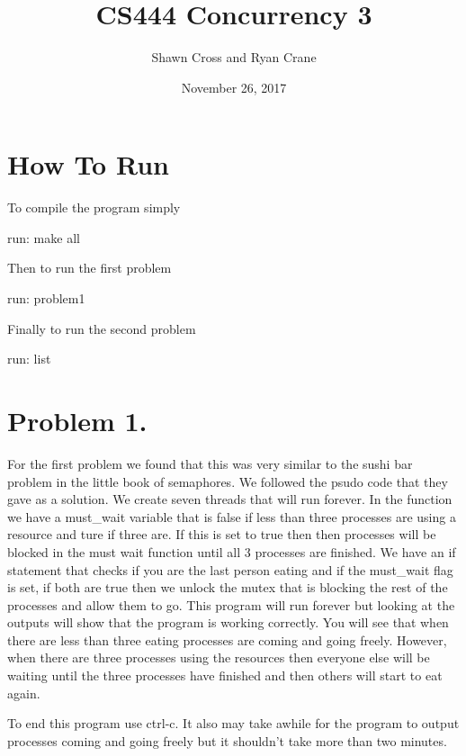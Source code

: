 \documentclass[letterpaper,10pt,titlepage]{article}
\begin{document}
\title{CS444 Concurrency 3}
\date{November 26, 2017}
\author{Shawn Cross and Ryan Crane}

\section{How To Run} To compile the program simply 

run: make all

Then to run the first problem 

run: problem1

Finally to run the second problem 

run: list

\section{Problem 1.} For the first problem we found that this was very similar 
to the sushi bar problem in the little book of semaphores. We followed the 
psudo code that they gave as a solution. We create seven threads that will 
run forever. In the function we have a must\_wait variable that is false if 
less than three processes are using a resource and ture if three are. If this is set to 
true then then processes will be blocked in the must wait function until all 3 processes 
are finished. We have an if statement that checks if you are the last person 
eating and if the must\_wait flag is set, if both are true then we unlock the 
mutex that is blocking the rest of the processes and allow them to go. This 
program will run forever but looking at the outputs will show that the 
program is working correctly. You will see that when there are less than 
three eating processes are coming and going freely. However, when there 
are three processes using the resources then everyone else will be waiting 
until the three processes have finished and then others will start to eat again.

To end this program use ctrl-c. It also may take awhile for the program to 
output processes coming and going freely but it shouldn't take more than 
two minutes.
\end{document}
